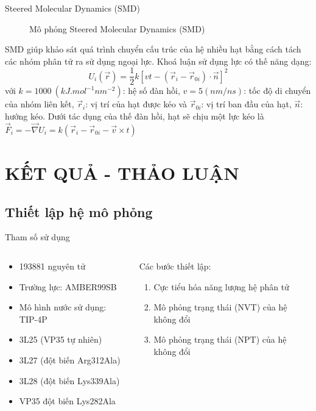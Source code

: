\documentclass[10pt]{beamer}
\begin{document}
\begin{frame}{Steered Molecular Dynamics (SMD)}
\begin{figure}
		\caption{Mô phỏng Steered Molecular Dynamics (SMD)}
		\label{fig:smd}
		\end{figure}
		SMD giúp khảo sát quá trình chuyển cấu trúc của hệ nhiều hạt bằng cách tách các nhóm phân tử ra sử dụng ngoại lực. Khoá luận sử dụng lực có thế năng dạng:
		\begin{equation}
		U_{i}\left(\vec{r}\right) = \dfrac{1}{2} k\left[ vt - \left( \vec{r}_{i}-\vec{r}_{0i} \right) \cdot\vec{n} \right]^{2}
		\end{equation}
		với $k = 1000\ \left( kJ . mol^ {-1} nm^ {-2} \right)$: hệ số đàn hồi, $v=5\left(nm/ns\right)$: tốc độ di chuyển của nhóm liên kết, $\vec{r}_{i}$: vị trí của hạt được kéo và $\vec{r}_{0i}$: vị trí ban đầu của hạt, $\vec{n}$: hướng kéo. Dưới tác dụng của thế đàn hồi, hạt sẽ chịu một lực kéo là $\vec{F}_{i} = -\vec{\nabla} U_{i} = k\left( \vec{r}_{i} - \vec{r}_{0i} -\vec{v}\times t\right)$

	\end{frame}
	
\section{KẾT QUẢ - THẢO LUẬN}
\subsection{Thiết lập hệ mô phỏng}
	\begin{frame}{Tham số sử dụng}
	\begin{columns}
	\begin{column}{0.5\textwidth}
	\begin{itemize}
	\item 193881 nguyên tử
	\item Trường lực: AMBER99SB
	\item Mô hình nước sử dụng: TIP-4P\cite{Horn2004}
	\item 3L25 (VP35 tự nhiên)
	\item 3L27 (đột biến Arg312Ala)
	\item 3L28 (đột biến Lys339Ala)
	\item VP35 đột biến Lys282Ala
	\end{itemize}
	\end{column}
	\begin{column}{0.5\textwidth}
	Các bước thiết lập:
	\begin{enumerate}
	\item Cực tiểu hóa năng lượng hệ phân tử
	\item Mô phỏng trạng thái (NVT) của hệ không đổi
	\item Mô phỏng trạng thái (NPT) của hệ không đổi
	\end{enumerate}
	\end{column}
	\end{columns}
	\end{frame}
\end{document}
